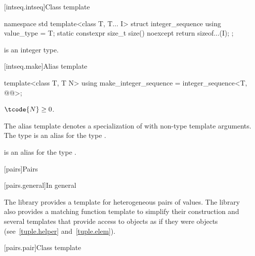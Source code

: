 [intseq.intseq]{Class template }

%
%
\begin{codeblock}
namespace std {
  template<class T, T... I> struct integer_sequence {
    using value_type = T;
    static constexpr size_t size() noexcept { return sizeof...(I); }
  };
}
\end{codeblock}

\pnum
\mandates
{} is an integer type.

[intseq.make]{Alias template }

%
\begin{itemdecl}
template<class T, T N>
  using make_integer_sequence = integer_sequence<T, @\seebelow{}@>;
\end{itemdecl}

\begin{itemdescr}
\pnum
\mandates
$\tcode{N} \geq 0$.

\pnum
The alias template
 denotes a specialization of
 with  non-type template arguments.
The type  is an alias for the type
.
\begin{note}
 is an alias for the type
.
\end{note}
\end{itemdescr}

[pairs]{Pairs}

[pairs.general]{In general}

\pnum
The library provides a template for heterogeneous pairs of values.
The library also provides a matching function template to simplify
their construction and several templates that provide access to 
objects as if they were  objects (see~\ref{tuple.helper}
and~\ref{tuple.elem}).%
%
%
%

[pairs.pair]{Class template }


